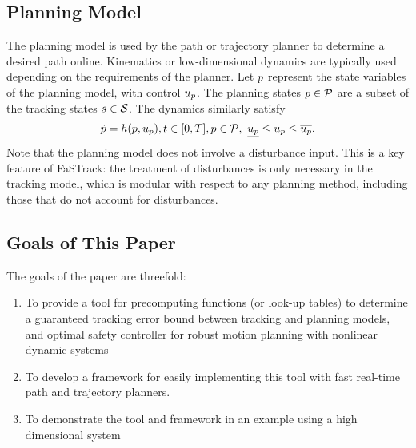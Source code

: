 \subsection{Planning Model}
The planning model is used by the path or trajectory planner to determine a desired path online. Kinematics or low-dimensional dynamics are typically used depending on the requirements of the planner. Let $p$ represent the state variables of the planning model, with control $u_p$. The planning states $p \in \mathcal{P}$ are a subset of the tracking states $s \in \mathcal{S}$. The dynamics similarly satisfy 
\begin{equation}
\begin{aligned}
\label{eq:pdyn}
\dot{p} = h(p, u_p), t \in [0, T], p \in \mathcal{P}, \ \underline{u_p} \leq u_p \leq \overline{u_p}.
\end{aligned}
\end{equation}
Note that the planning model does not involve a disturbance input. This is a key feature of FaSTrack: the treatment of disturbances is only necessary in the tracking model, which is modular with respect to any planning method, including those that do not account for disturbances.

\subsection{Goals of This Paper}
The goals of the paper are threefold:
\begin{enumerate}
	\item To provide a tool for precomputing functions (or look-up tables) to determine a guaranteed tracking error bound between tracking and planning models, and optimal safety controller for robust motion planning with nonlinear dynamic systems
	\item To develop a framework for easily implementing this tool with fast real-time path and trajectory planners.
	\item To demonstrate the tool and framework in an example using a high dimensional system
\end{enumerate}
